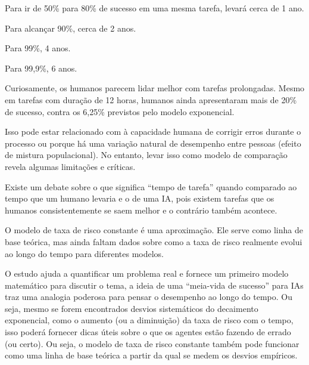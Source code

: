 {\begin{hypeitemize}
\item Para ir de 50\% para 80\% de sucesso em uma mesma tarefa, levará cerca de 1 ano.
\item Para alcançar 90\%, cerca de 2 anos.
\item Para 99\%, 4 anos.
\item Para 99,9\%, 6 anos.
\end{hypeitemize}

\subtitle{Levar o pensamento humano}

\hspace*{1.5em} Curiosamente, os humanos parecem lidar melhor com tarefas prolongadas. Mesmo em tarefas com duração de 12 horas, humanos ainda apresentaram mais de 20\% de sucesso, contra os 6,25\% previstos pelo modelo exponencial.

\hspace*{1.5em} Isso pode estar relacionado com à capacidade humana de corrigir erros durante o processo ou porque há uma variação natural de desempenho entre pessoas (efeito de mistura populacional). No entanto, levar isso como modelo de comparação revela algumas limitações e críticas.

\subtitle{Limitações e críticas}

\begin{hypeitemize}
\item Existe um debate sobre o que significa “tempo de tarefa” quando comparado ao tempo que um humano levaria e o de uma IA, pois existem tarefas que os humanos consistentemente se saem melhor e o contrário também acontece.
\item O modelo de taxa de risco constante é uma aproximação. Ele serve como linha de base teórica, mas ainda faltam dados sobre como a taxa de risco realmente evolui ao longo do tempo para diferentes modelos.
\end{hypeitemize}

\subtitle{Conclusão}

\hspace*{1.5em} O estudo ajuda a quantificar um problema real e fornece um primeiro modelo matemático para discutir o tema, a ideia de uma “meia-vida de sucesso” para IAs traz uma analogia poderosa para pensar o desempenho ao longo do tempo. Ou seja, mesmo se forem encontrados desvios sistemáticos do decaimento exponencial, como o aumento (ou a diminuição) da taxa de risco com o tempo, isso poderá fornecer dicas úteis sobre o que os agentes estão fazendo de errado (ou certo). Ou seja, o modelo de taxa de risco constante também pode funcionar como uma linha de base teórica a partir da qual se medem os desvios empíricos.

}
